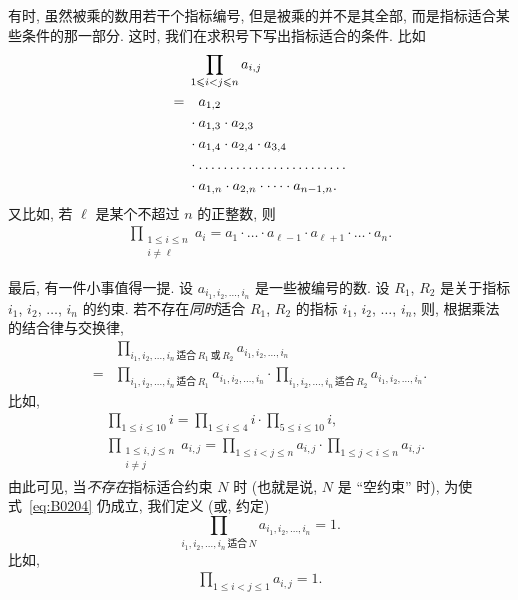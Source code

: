 有时, 虽然被乘的数用若干个指标编号,
但是被乘的并不是其全部,
而是指标适合某些条件的那一部分.
这时, 我们在求积号下写出指标适合的条件.
比如
\begin{align*}
         & \prod_{1 \leq i < j \leq n} {a_{i,j}}
    \\
    = {} & \hphantom{{} \cdot {}} a_{1,2}
    \\
         & \cdot a_{1,3} \cdot a_{2,3}
    \\
         & \cdot a_{1,4} \cdot a_{2,4} \cdot a_{3,4}
    \\
         & \cdot
    \dots \dots \dots \dots
    \dots \dots \dots \dots
    \\
         & \cdot a_{1,n} \cdot a_{2,n}
    \cdot \dots \cdot a_{n-1,n}.
\end{align*}
又比如, 若 \(\ell\) 是某个不超过 \(n\) 的正整数, 则
\begin{align*}
    \prod_{\substack{1 \leq i \leq n \\i \neq \ell}}
    {a_i}
    = a_1 \cdot \dots \cdot a_{\ell-1}
    \cdot a_{\ell+1} \cdot \dots \cdot a_n.
\end{align*}

最后, 有一件小事值得一提.
设 \(a_{i_1, i_2, \dots, i_n}\) 是一些被编号的数.
设 \(R_1\), \(R_2\)
是关于指标 \(i_1\), \(i_2\), \(\dots\), \(i_n\) 的约束.
若不存在\emph{同时}适合 \(R_1\), \(R_2\)
的指标 \(i_1\), \(i_2\), \(\dots\), \(i_n\),
则, 根据乘法的结合律与交换律,
\begin{equation}
    \begin{aligned}
             & \prod_{i_1,i_2,\dots,i_n
            \,\text{适合}\,R_1\,\text{或}\,R_2}
        {a_{i_1, i_2, \dots, i_n}}
        \\
        = {} & \prod_{i_1,i_2,\dots,i_n\,\text{适合}\,R_1}
        {a_{i_1, i_2, \dots, i_n}}
        \cdot \prod_{i_1,i_2,\dots,i_n\,\text{适合}\,R_2}
        {a_{i_1, i_2, \dots, i_n}}.
    \end{aligned}
    \label{eq:B0204}
\end{equation}
比如,
\begin{align*}
     & \prod_{1 \leq i \leq 10} {i}
    = \prod_{1 \leq i \leq 4} {i}
    \cdot \prod_{5 \leq i \leq 10} {i},
    \\
     & \prod_{\substack{1 \leq i, j \leq n \\i \neq j}} {a_{i,j}}
    = \prod_{1 \leq i < j \leq n} {a_{i,j}}
    \cdot \prod_{1 \leq j < i \leq n} {a_{i,j}}.
\end{align*}
由此可见, 当\emph{不存在}指标适合约束 \(N\) 时
(也就是说, \(N\) 是 ``空约束'' 时),
为使式~\eqref{eq:B0204} 仍成立,
我们定义 (或, 约定)
\begin{equation}
    \prod_{i_1,i_2,\dots,i_n\,\text{适合}\,N}
    {a_{i_1, i_2, \dots, i_n}} = 1.
    \label{eq:B0205}
\end{equation}
比如,
\begin{align*}
    \prod_{1 \leq i < j \leq 1} {a_{i,j}} = 1.
\end{align*}

